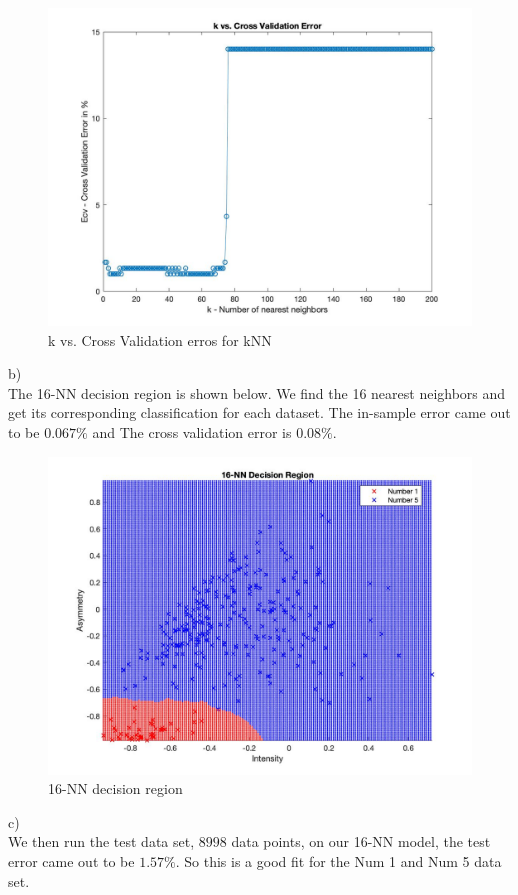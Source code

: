 \documentclass[12pt]{article}
\begin{document}
\begin{figure}[H]
  \centering
  \includegraphics[scale = 0.27]{2.jpg}
  \caption{k vs. Cross Validation erros for kNN}
  \label{fig:2}
\end{figure}
\noindent b)\\
\indent The 16-NN decision region is shown below. We find the 16 nearest neighbors and get its corresponding classification for each dataset. The in-sample error came out to be $0.067\%$ and The cross validation error is $0.08\%$.
 \begin{figure}[H]
  \centering
  \includegraphics[scale = 0.27]{3.jpg}
  \caption{16-NN decision region}
  \label{fig:3}
\end{figure}
\noindent c)\\
\indent We then run the test data set, $8998$ data points, on our 16-NN model, the test error came out to be $1.57\%$. So this is a good fit for the Num 1 and Num 5 data set.
\end{document}
